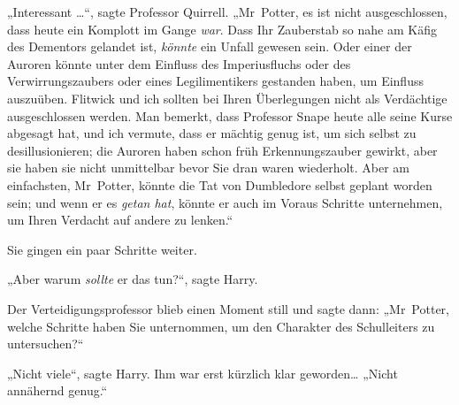 „Interessant …“, sagte Professor Quirrell. „Mr~Potter, es ist nicht ausgeschlossen, dass heute ein Komplott im Gange \emph{war}. Dass Ihr Zauberstab so nahe am Käfig des Dementors gelandet ist, \emph{könnte} ein Unfall gewesen sein. Oder einer der Auroren könnte unter dem Einfluss des Imperiusfluchs oder des Verwirrungszaubers oder eines Legilimentikers gestanden haben, um Einfluss auszuüben. Flitwick und ich sollten bei Ihren Überlegungen nicht als Verdächtige ausgeschlossen werden. Man bemerkt, dass Professor Snape heute alle seine Kurse abgesagt hat, und ich vermute, dass er mächtig genug ist, um sich selbst zu desillusionieren; die Auroren haben schon früh Erkennungszauber gewirkt, aber sie haben sie nicht unmittelbar bevor Sie dran waren wiederholt. Aber am einfachsten, Mr~Potter, könnte die Tat von Dumbledore selbst geplant worden sein; und wenn er es \emph{getan hat}, könnte er auch im Voraus Schritte unternehmen, um Ihren Verdacht auf andere zu lenken.“

Sie gingen ein paar Schritte weiter.

„Aber warum \emph{sollte} er das tun?“, sagte Harry.

Der Verteidigungsprofessor blieb einen Moment still und sagte dann: „Mr~Potter, welche Schritte haben Sie unternommen, um den Charakter des Schulleiters zu untersuchen?“

„Nicht viele“, sagte Harry. Ihm war erst kürzlich klar geworden… „Nicht annähernd genug.“

